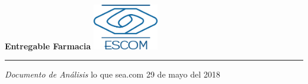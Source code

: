 \documentclass[10pt]{book}
\begin{document}
\begin{titlepage}
  \vspace*{4cm}
  {\fontsize{28}{34}\selectfont\bfseries Entregable Farmacia}
  \hfill
  \includegraphics[height=2cm]{images/ipn} \\
  {
  \color{gris}\hrule}
  \Large{\itshape Documento de Análisis}
  \vfill
  {\large lo que sea.com \hfill 29 de mayo del 2018}
\end{titlepage}








\end{document}
